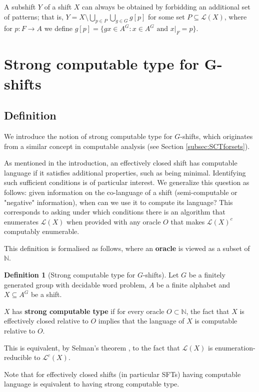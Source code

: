 \documentclass[french,american]{article}
\theoremstyle{plain}
\theoremstyle{definition}
\newtheorem{definition}[theorem]{Definition}
\theoremstyle{remark}
\theoremstyle{plain}
\begin{document}
A subshift $Y$ of a shift $X$ can always be obtained by forbidding an additional set of patterns; that is, $Y = X\setminus\bigcup_{p\in P}\bigcup_{g\in G}g[p]$ for some set $P \subseteq \mathcal L(X)$, where for $p:F\to A$ we define $g[p]=\{gx\in A^{G}:x\in A^{G}\text{ and }x|_{F}=p\}$.

\section{Strong computable type for G-shifts}\label{sec:Strong-computable-type}



\subsection{Definition}

We introduce the notion of strong computable type for $G$-shifts,
which originates from a similar concept in computable analysis (see
Section \ref{subsec:SCTforsets}).

As mentioned in the introduction, an effectively closed shift has computable language if it satisfies additional properties, such as being minimal. Identifying such sufficient conditions is of particular interest.
We generalize this question as follows: given information on the co-language of a shift (semi-computable or "negative" information), when can we use it to compute its language? This corresponds to asking under which conditions there is an algorithm that enumerates $\mathcal L(X)$ when provided with any oracle $O$ that makes $\mathcal L(X)^c$ computably enumerable.

This definition is formalised as follows, where an \textbf{oracle} is viewed as a subset of $\mathbb{N}$.
\begin{definition}[Strong computable type for $G$-shifts]
Let $G$ be a finitely generated group with  decidable word problem,
$A$ be a finite alphabet and $X\subseteq A^{G}$ be a shift. 

$X$ has \textbf{strong computable type} if for every oracle $O\subset\mathbb{N}$,
the fact that $X$ is effectively closed relative to $O$ implies that the
language of $X$ is computable relative to $O$.
\end{definition}

This is equivalent, by Selman's theorem \cite{selman1971arith}, to the fact that $\mathcal L(X)$ is enumeration-reducible to $\mathcal L^c(X)$.

Note that for effectively closed shifts (in particular SFTs) having computable
language is equivalent to having strong computable type. 
\end{document}
